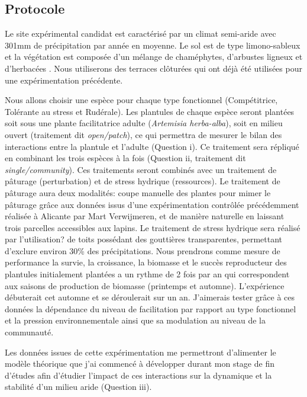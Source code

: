 \documentclass[12pt]{article} %
\begin{document}
\subsection{Protocole}

Le site expérimental candidat est caractérisé par un climat semi-aride  avec 301mm de précipitation par année en moyenne. Le sol est de type limono-sableux et la végétation est composée d'un mélange de chaméphytes, d'arbustes ligneux et d'herbacées \citep{Verwijmeren2014}. Nous utiliserons des terraces clôturées qui ont déjà été utilisées pour une expérimentation précédente. %

Nous allons choisir une espèce pour chaque type fonctionnel (Compétitrice, Tolérante au stress et Rudérale). Les plantules de chaque espèce seront plantées soit sous une plante facilitatrice adulte (\textit{Artemisia herba-alba}), soit en milieu ouvert (traitement dit \textit{open/patch}), ce qui permettra de mesurer le bilan des interactions entre la plantule et l'adulte (Question i). Ce traitement sera répliqué en combinant les trois espèces à la fois (Question ii, traitement dit \textit{single/community}). Ces traitements seront combinés avec un traitement de pâturage (perturbation) et de stress hydrique (ressources). Le traitement de pâturage aura deux modalités: coupe manuelle des plantes pour mimer le pâturage grâce aux données issus d'une expérimentation contrôlée précédemment réalisée à Alicante par Mart Verwijmeren, et de manière naturelle en laissant trois parcelles accessibles aux lapins. Le traitement de stress hydrique sera réalisé par l'utilisation? de toits possédant des gouttières transparentes, permettant d'exclure environ 30\% des précipitations. Nous prendrons comme mesure de performance la survie, la croissance, la biomasse et le succès reproducteur des plantules initialement plantées a un rythme de 2 fois par an qui correspondent aux saisons de production de biomasse (printemps et automne). L'expérience débuterait cet automne et se déroulerait sur un an. J'aimerais tester grâce à ces données la dépendance du niveau de facilitation par rapport au type fonctionnel et la pression environnementale ainsi que sa modulation au niveau de la communauté.

Les données issues de cette expérimentation me permettront d'alimenter le modèle théorique que j'ai commencé à développer durant mon stage de fin d'études afin d'étudier l'impact de ces interactions sur la dynamique et la stabilité d'un milieu aride (Question iii).
\end{document}
